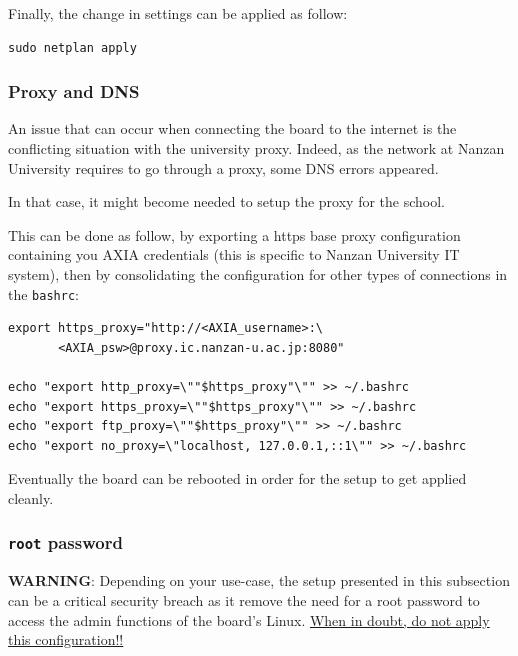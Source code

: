 \documentclass[10pt]{article}
\begin{document}
Finally, the change in settings can be applied
as follow:

\begin{verbatim}
sudo netplan apply
\end{verbatim}

\subsubsection{Proxy and DNS}
\label{sec:org87b52be}
An issue that can occur when connecting the board to the internet is the
conflicting situation with the university proxy.
Indeed, as the network at Nanzan University requires to go through a proxy,
some DNS errors appeared.

In that case, it might become needed to setup the proxy for the school.

This can be done as follow, by exporting a https base proxy configuration
containing you AXIA credentials (this is specific to Nanzan University IT system),
then by consolidating the configuration for other types of connections in the \texttt{bashrc}:

\begin{verbatim}
export https_proxy="http://<AXIA_username>:\
       <AXIA_psw>@proxy.ic.nanzan-u.ac.jp:8080"

echo "export http_proxy=\""$https_proxy"\"" >> ~/.bashrc
echo "export https_proxy=\""$https_proxy"\"" >> ~/.bashrc
echo "export ftp_proxy=\""$https_proxy"\"" >> ~/.bashrc
echo "export no_proxy=\"localhost, 127.0.0.1,::1\"" >> ~/.bashrc
\end{verbatim}

Eventually the board can be rebooted in order for the setup to get applied cleanly.

\subsubsection{\texttt{root} password}
\label{sec:orgf8671bc}
\begin{tcolorbox}[colback=orange!5!white,colframe=orange!75!black]
\textbf{WARNING}: Depending on your use-case, the setup presented in this
subsection can be a critical security breach as it remove the need for a root
password to access the admin functions of the board's Linux.
\uline{When in doubt, do not apply this configuration!!}
\end{tcolorbox}
\end{document}
